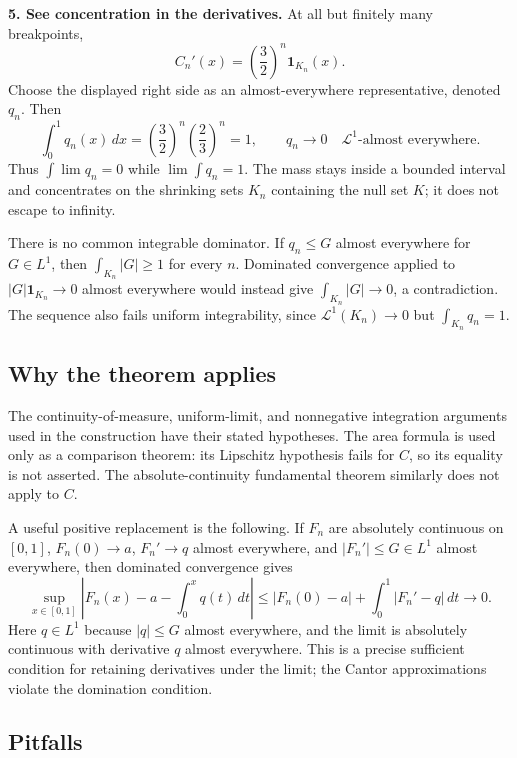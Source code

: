 \documentclass[
  11pt,
]{article}
\begin{document}
\textbf{5. See concentration in the derivatives.} At all but finitely
many breakpoints, \[
C_n'(x)=\left(\frac32\right)^n\mathbf1_{K_n}(x).
\] Choose the displayed right side as an almost-everywhere
representative, denoted \(q_n\). Then \[
\int_0^1q_n(x)\,dx
=\left(\frac32\right)^n\left(\frac23\right)^n=1,
\qquad q_n\longrightarrow0\quad\mathcal L^1\text{-almost everywhere}.
\] Thus \(\int\lim q_n=0\) while \(\lim\int q_n=1\). The mass stays
inside a bounded interval and concentrates on the shrinking sets \(K_n\)
containing the null set \(K\); it does not escape to infinity.

There is no common integrable dominator. If \(q_n\leq G\) almost
everywhere for \(G\in L^1\), then \(\int_{K_n}|G|\geq1\) for every
\(n\). Dominated convergence applied to \(|G|\mathbf1_{K_n}\to0\) almost
everywhere would instead give \(\int_{K_n}|G|\to0\), a contradiction.
The sequence also fails uniform integrability, since
\(\mathcal L^1(K_n)\to0\) but \(\int_{K_n}q_n=1\).

\subsection{Why the theorem applies}\label{why-the-theorem-applies-12}

The continuity-of-measure, uniform-limit, and nonnegative integration
arguments used in the construction have their stated hypotheses. The
area formula is used only as a comparison theorem: its Lipschitz
hypothesis fails for \(C\), so its equality is not asserted. The
absolute-continuity fundamental theorem similarly does not apply to
\(C\).

A useful positive replacement is the following. If \(F_n\) are
absolutely continuous on \([0,1]\), \(F_n(0)\to a\), \(F_n'\to q\)
almost everywhere, and \(|F_n'|\leq G\in L^1\) almost everywhere, then
dominated convergence gives \[
\sup_{x\in[0,1]}\left|F_n(x)-a-\int_0^xq(t)\,dt\right|
\leq |F_n(0)-a|+\int_0^1|F_n'-q|\,dt\longrightarrow0.
\] Here \(q\in L^1\) because \(|q|\leq G\) almost everywhere, and the
limit is absolutely continuous with derivative \(q\) almost everywhere.
This is a precise sufficient condition for retaining derivatives under
the limit; the Cantor approximations violate the domination condition.

\subsection{Pitfalls}\label{pitfalls-12}
\end{document}
